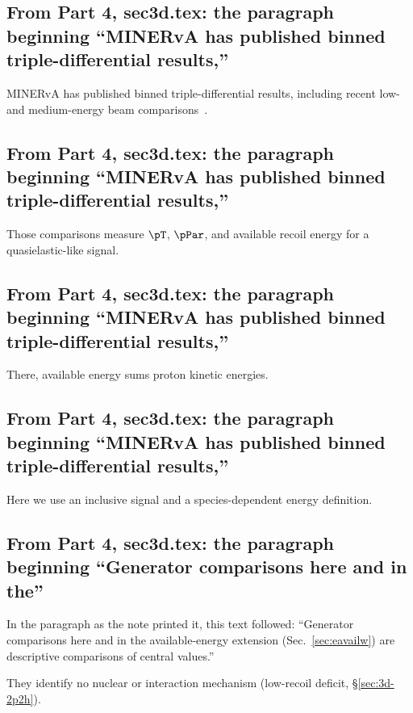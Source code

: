 \subsection{From Part 4, sec3d.tex: the paragraph beginning ``MINERvA has published binned triple-differential results,''}
MINERvA has published binned triple-differential results, including recent low- and medium-energy beam comparisons~\cite{MINERvA:2026qeleme}.

\subsection{From Part 4, sec3d.tex: the paragraph beginning ``MINERvA has published binned triple-differential results,''}
Those comparisons measure $\pT$, $\pPar$, and available recoil energy for a quasielastic-like signal.

\subsection{From Part 4, sec3d.tex: the paragraph beginning ``MINERvA has published binned triple-differential results,''}
There, available energy sums proton kinetic energies.

\subsection{From Part 4, sec3d.tex: the paragraph beginning ``MINERvA has published binned triple-differential results,''}
Here we use an inclusive signal and a species-dependent energy definition.

\subsection{From Part 4, sec3d.tex: the paragraph beginning ``Generator comparisons here and in the''}
In the paragraph as the note printed it, this text followed: ``Generator comparisons here and in the available-energy extension (Sec.~\ref{sec:eavailw}) are descriptive comparisons of central values.''\par
They identify no nuclear or interaction mechanism (low-recoil deficit, \S\ref{sec:3d-2p2h}).


